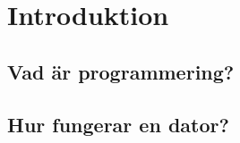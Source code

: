 
\chapter{Introduktion}

\begin{itemize}[nosep]

\end{itemize}

\section{Vad är programmering?}
\lipsum

\section{Hur fungerar en dator?}
\lipsum




